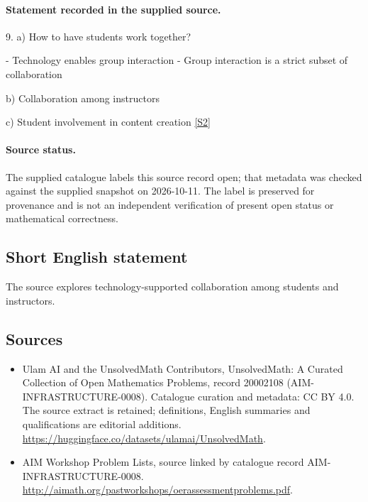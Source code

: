 \documentclass[11pt]{article}
\begin{document}
\paragraph{Statement recorded in the supplied source.}
9. a) How to have students work together?

- Technology enables group interaction - Group interaction is a strict subset of collaboration

b) Collaboration among instructors

c) Student involvement in content creation \href{http://aimath.org/pastworkshops/oerassessmentproblems.pdf}{[S2]}
\paragraph{Source status.}
The supplied catalogue labels this source record open; that metadata was checked against the supplied snapshot on 2026-10-11. The label is preserved for provenance and is not an independent verification of present open status or mathematical correctness.
\subsection{Short English statement}
The source explores technology-supported collaboration among students and instructors.
\subsection{Sources}
\begin{itemize}
\item[S1] Ulam AI and the UnsolvedMath Contributors, UnsolvedMath: A Curated Collection of Open Mathematics Problems, record 20002108 (AIM-INFRASTRUCTURE-0008). Catalogue curation and metadata: CC BY 4.0. The source extract is retained; definitions, English summaries and qualifications are editorial additions.
\url{https://huggingface.co/datasets/ulamai/UnsolvedMath}.
\item[S2] AIM Workshop Problem Lists, source linked by catalogue record AIM-INFRASTRUCTURE-0008.
\url{http://aimath.org/pastworkshops/oerassessmentproblems.pdf}.
\end{itemize}
\end{document}
